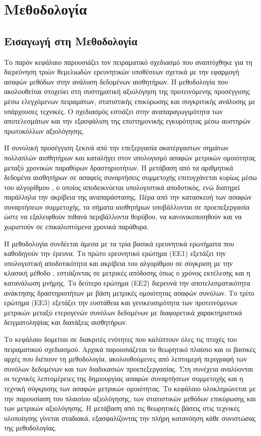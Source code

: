 \chapter{Μεθοδολογία}

\section{Εισαγωγή στη Μεθοδολογία}

Το παρόν κεφάλαιο παρουσιάζει τον πειραματικό σχεδιασμό που αναπτύχθηκε για τη διερεύνηση τριών θεμελιωδών ερευνητικών υποθέσεων σχετικά με την εφαρμογή ασαφών μεθόδων στην ανάλυση δεδομένων αισθητήρων.
Η μεθοδολογία που ακολουθείται στοχεύει στη συστηματική αξιολόγηση της προτεινόμενης προσέγγισης μέσω ελεγχόμενων πειραμάτων, στατιστικής επικύρωσης και συγκριτικής ανάλυσης με υπάρχουσες τεχνικές.
Ο σχεδιασμός εστιάζει στην αναπαραγωγιμότητα των αποτελεσμάτων και την εξασφάλιση της επιστημονικής εγκυρότητας μέσω αυστηρών πρωτοκόλλων αξιολόγησης.

Η συνολική προσέγγιση ξεκινά από την επεξεργασία ακατέργαστων σημάτων πολλαπλών αισθητήρων και καταλήγει στον υπολογισμό ασαφών μετρικών ομοιότητας μεταξύ χρονικών παραθύρων δραστηριοτήτων.
Η μετάβαση από τα αριθμητικά δεδομένα αισθητήρων σε ασαφείς συναρτήσεις συμμετοχής επιτυγχάνεται κυρίως μέσω του αλγορίθμου \cite{Truong2012}, ο οποίος αποδεικνύεται υπολογιστικά αποδοτικός, ενώ διατηρεί παράλληλα την ακρίβεια της αναπαράστασης.
Πέρα από την κατασκευή των ασαφών συναρτήσεων συμμετοχής, τα σήματα αισθητήρων υποβάλλονται σε προεπεξεργασία ώστε να εξαλειφθούν πιθανά περιβάλλοντα θορύβου, να κανονικοποιηθούν και να χωριστούν σε επικαλυπτόμενα χρονικά παράθυρα.

Η μεθοδολογία συνδέεται άμεσα με τα τρία βασικά ερευνητικά ερωτήματα που καθοδηγούν την έρευνα.
Το πρώτο ερευνητικό ερώτημα (ΕΕ1) εξετάζει την υπολογιστική αποδοτικότητα και ακρίβεια του αλγορίθμου  σε σύγκριση με την κλασική μέθοδο , εστιάζοντας σε μετρικές απόδοσης όπως ο χρόνος εκτέλεσης και η κατανάλωση μνήμης.
Το δεύτερο ερώτημα (ΕΕ2) διερευνά την αποτελεσματικότητα ανάκτησης δραστηριοτήτων με βάση μετρικές ομοιότητας ασαφών συνόλων.
Το τρίτο ερώτημα (ΕΕ3) εξετάζει την ευστάθεια και γενικευσιμότητα των προτεινόμενων μετρικών μεταξύ ετερογενών συνόλων δεδομένων με διαφορετικά χαρακτηριστικά δειγματοληψίας και διατάξεις αισθητήρων.

Το κεφάλαιο δομείται σε διακριτές ενότητες που καλύπτουν όλες τις πτυχές του πειραματικού σχεδιασμού.
Αρχικά παρουσιάζεται το θεωρητικό πλαίσιο και οι βασικές αρχές που διέπουν τη μεθοδολογία, ακολουθούμενες από λεπτομερή περιγραφή των συνόλων δεδομένων και των διαδικασιών προεπεξεργασίας.
Στη συνέχεια αναλύονται οι τεχνικές λεπτομέρειες της δημιουργίας ασαφών συναρτήσεων συμμετοχής και η τεχνική σύγκρισης των ασαφών μετρικών ομοιότητας.
Το κεφάλαιο ολοκληρώνεται με την παρουσίαση του πλαισίου αξιολόγησης, των στατιστικών μεθόδων επικύρωσης και των μετρικών αξιολόγησης.
Η μετάβαση από τις θεωρητικές βάσεις στις τεχνικές υλοποίησης γίνεται σταδιακά, εξασφαλίζοντας την πλήρη κατανόηση κάθε συνιστώσας της μεθοδολογίας.

